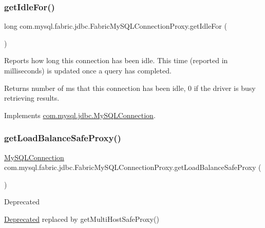 \subsubsection{\texorpdfstring{get\+Idle\+For()}{getIdleFor()}}
{\footnotesize\ttfamily long com.\+mysql.\+fabric.\+jdbc.\+Fabric\+My\+S\+Q\+L\+Connection\+Proxy.\+get\+Idle\+For (\begin{DoxyParamCaption}{ }\end{DoxyParamCaption})}

Reports how long this connection has been idle. This time (reported in milliseconds) is updated once a query has completed.

\begin{DoxyReturn}{Returns}
number of ms that this connection has been idle, 0 if the driver is busy retrieving results. 
\end{DoxyReturn}


Implements \mbox{\hyperlink{interfacecom_1_1mysql_1_1jdbc_1_1_my_s_q_l_connection_a835df16f7b2e35f0729ba560fd210a2a}{com.\+mysql.\+jdbc.\+My\+S\+Q\+L\+Connection}}.

\mbox{\label{classcom_1_1mysql_1_1fabric_1_1jdbc_1_1_fabric_my_s_q_l_connection_proxy_afb882b6df0430c4a690b828c9eb85244}} 
\subsubsection{\texorpdfstring{get\+Load\+Balance\+Safe\+Proxy()}{getLoadBalanceSafeProxy()}}
{\footnotesize\ttfamily \mbox{\hyperlink{interfacecom_1_1mysql_1_1jdbc_1_1_my_s_q_l_connection}{My\+S\+Q\+L\+Connection}} com.\+mysql.\+fabric.\+jdbc.\+Fabric\+My\+S\+Q\+L\+Connection\+Proxy.\+get\+Load\+Balance\+Safe\+Proxy (\begin{DoxyParamCaption}{ }\end{DoxyParamCaption})}

\begin{DoxyRefDesc}{Deprecated}
\item[\mbox{\hyperlink{deprecated__deprecated000001}{Deprecated}}]replaced by {\ttfamily get\+Multi\+Host\+Safe\+Proxy()} \end{DoxyRefDesc}


